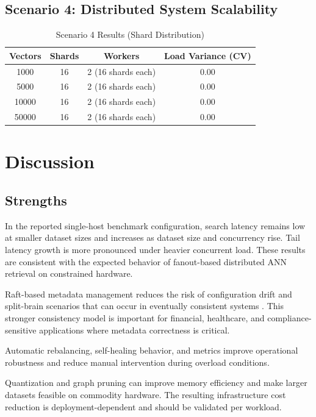 \documentclass[conference]{IEEEtran}
\begin{document}
\subsection{Scenario 4: Distributed System Scalability}

\begin{table}[htbp]
\centering
\caption{Scenario 4 Results (Shard Distribution)}
\label{tab:scenario4}
\begin{tabular}{@{}cccc@{}}
\toprule
\textbf{Vectors} & \textbf{Shards} & \textbf{Workers} & \textbf{Load Variance (CV)} \\
\midrule
1000  & 16 & 2 (16 shards each) & 0.00 \\
5000  & 16 & 2 (16 shards each) & 0.00 \\
10000 & 16 & 2 (16 shards each) & 0.00 \\
50000 & 16 & 2 (16 shards each) & 0.00 \\
\bottomrule
\end{tabular}
\end{table}

\section{Discussion}

\subsection{Strengths}

In the reported single-host benchmark configuration, search latency remains low at smaller dataset sizes and increases as dataset size and concurrency rise. Tail latency growth is more pronounced under heavier concurrent load. These results are consistent with the expected behavior of fanout-based distributed ANN retrieval on constrained hardware.

Raft-based metadata management reduces the risk of configuration drift and split-brain scenarios that can occur in eventually consistent systems \cite{raft,cap}. This stronger consistency model is important for financial, healthcare, and compliance-sensitive applications where metadata correctness is critical.

Automatic rebalancing, self-healing behavior, and metrics improve operational robustness and reduce manual intervention during overload conditions.

Quantization and graph pruning can improve memory efficiency and make larger datasets feasible on commodity hardware. The resulting infrastructure cost reduction is deployment-dependent and should be validated per workload.
\end{document}
